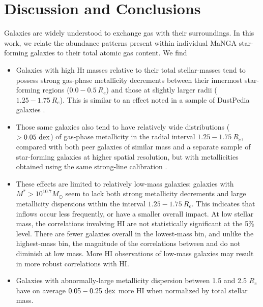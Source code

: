 \section{Discussion and Conclusions}
\label{sec:disc}

Galaxies are widely understood to exchange gas with their surroundings. In this work, we relate the abundance patterns present within individual MaNGA star-forming galaxies to their total atomic gas content. We find
\begin{itemize}
    \item Galaxies with high H\textsc{i} masses relative to their total stellar-masses tend to possess strong gas-phase metallicity decrements between their innermost star-forming regions ($0.0-0.5~R_e$) and those at slightly larger radii ($1.25-1.75~R_e$). This is similar to an effect noted in a sample of DustPedia galaxies \citep{devis_2019_dustpedia}.
    \item Those same galaxies also tend to have relatively wide distributions ($> 0.05~{\rm dex}$) of gas-phase metallicity in the radial interval $1.25-1.75 ~ R_e$, compared with both peer galaxies of similar mass and a separate sample of star-forming galaxies at higher spatial resolution, but with metallicities obtained using the same strong-line calibration \citep{kreckel_2019_phangs_metgrads}.
    \item These effects are limited to relatively low-mass galaxies: galaxies with $M^* > 10^{10.7} M_{\odot}$ seem to lack both strong metallicity decrements and large metallicity dispersions within the interval $1.25-1.75 ~ R_e$. This indicates that inflows occur less frequently, or have a smaller overall impact. At low stellar mass, the correlations involving HI are not statistically significant at the 5\% level. There are fewer galaxies overall in the lowest-mass bin, and unlike the highest-mass bin, the magnitude of the correlations between \metdec and \metdisp do not diminish at low mass. More HI observations of low-mass galaxies may result in more robust correlations with HI.
    \item Galaxies with abnormally-large metallicity dispersion between 1.5 and 2.5 $R_e$ have on average $0.05-0.25 ~ {\rm dex}$ more HI when normalized by total stellar mass.
\end{itemize}

